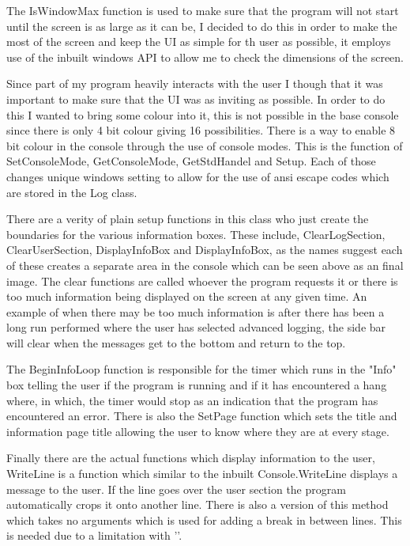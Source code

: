 \begin{FlushLeft}
    The IsWindowMax function is used to make sure that the program will not start until the screen is as large as it can be, I decided to do this in order to make the most of the screen and keep the UI as simple for th user as possible, it employs use of the inbuilt windows API to allow me to check the dimensions of the screen. \\ \bk

    Since part of my program heavily interacts with the user I though that it was important to make sure that the UI was as inviting as possible. In order to do this I wanted to bring some colour into it, this is not possible in the base console since there is only 4 bit colour giving 16 possibilities. There is a way to enable 8 bit colour in the console through the use of console modes. This is the function of SetConsoleMode, GetConsoleMode, GetStdHandel and Setup. Each of those changes unique windows setting to allow for the use of ansi escape codes which are stored in the Log class. \\ \bk

    There are a verity of plain setup functions in this class who just create the boundaries for the various information boxes. These include, ClearLogSection, ClearUserSection, DisplayInfoBox and DisplayInfoBox, as the names suggest each of these creates a separate area in the console which can be seen above as an final image. The clear functions are called whoever the program requests it or there is too much information being displayed on the screen at any given time. An example of when there may be too much information is after there has been a long run performed where the user has selected advanced logging, the side bar will clear when the messages get to the bottom and return to the top. \\ \bk

    The BeginInfoLoop function is responsible for the timer which runs in the "Info" box telling the user if the program is running and if it has encountered a hang where, in which, the timer would stop as an indication that the program has encountered an error. There is also the SetPage function which sets the title and information page title allowing the user to know where they are at every stage.\\ \bk

    Finally there are the actual functions which display information to the user, WriteLine is a function which similar to the inbuilt Console.WriteLine displays a message to the user. If the line goes over the user section the program automatically crops it onto another line. There is also a version of this method which takes no arguments which is used for adding a break in between lines. This is needed due to a limitation with '\n'.


\end{FlushLeft}
